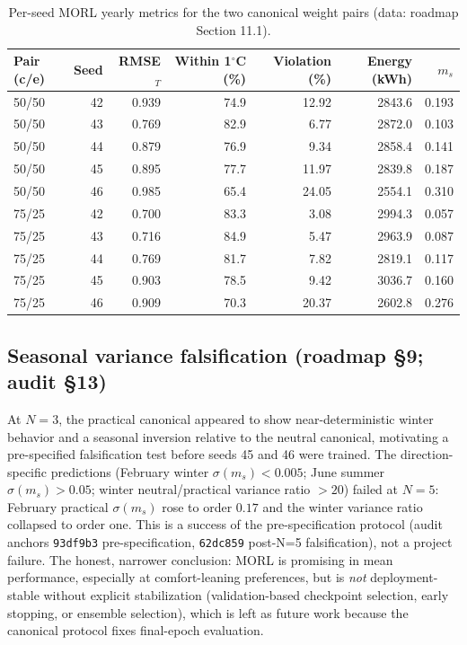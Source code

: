\documentclass[11pt,a4paper]{article}
\begin{document}
\begin{table}[H]
\centering
\caption{Per-seed MORL yearly metrics for the two canonical weight pairs (data: roadmap Section 11.1).}
\label{tab:morl_per_seed}
\small
\begin{tabular}{lrrrrrr}
\toprule
Pair (c/e) & Seed & RMSE$_T$ & Within 1$^\circ$C (\%) & Violation (\%) & Energy (kWh) & $m_s$ \\
\midrule
50/50 & 42 & 0.939 & 74.9 & 12.92 & 2843.6 & 0.193 \\
50/50 & 43 & 0.769 & 82.9 & 6.77 & 2872.0 & 0.103 \\
50/50 & 44 & 0.879 & 76.9 & 9.34 & 2858.4 & 0.141 \\
50/50 & 45 & 0.895 & 77.7 & 11.97 & 2839.8 & 0.187 \\
50/50 & 46 & 0.985 & 65.4 & 24.05 & 2554.1 & 0.310 \\
75/25 & 42 & 0.700 & 83.3 & 3.08 & 2994.3 & 0.057 \\
75/25 & 43 & 0.716 & 84.9 & 5.47 & 2963.9 & 0.087 \\
75/25 & 44 & 0.769 & 81.7 & 7.82 & 2819.1 & 0.117 \\
75/25 & 45 & 0.903 & 78.5 & 9.42 & 3036.7 & 0.160 \\
75/25 & 46 & 0.909 & 70.3 & 20.37 & 2602.8 & 0.276 \\
\bottomrule
\end{tabular}
\end{table}

\subsection{Seasonal variance falsification (roadmap \S9; audit \S13)}

At $N=3$, the practical canonical appeared to show near-deterministic winter behavior and a seasonal inversion relative to the neutral canonical, motivating a pre-specified falsification test before seeds 45 and 46 were trained. The direction-specific predictions (February winter $\sigma(m_s)<0.005$; June summer $\sigma(m_s)>0.05$; winter neutral/practical variance ratio $>20$) failed at $N=5$: February practical $\sigma(m_s)$ rose to order $0.17$ and the winter variance ratio collapsed to order one. This is a success of the pre-specification protocol (audit anchors \texttt{93df9b3} pre-specification, \texttt{62dc859} post-N=5 falsification), not a project failure. The honest, narrower conclusion: MORL is promising in mean performance, especially at comfort-leaning preferences, but is \emph{not} deployment-stable without explicit stabilization (validation-based checkpoint selection, early stopping, or ensemble selection), which is left as future work because the canonical protocol fixes final-epoch evaluation.
\end{document}
